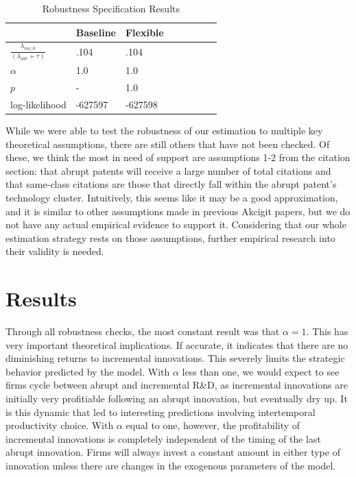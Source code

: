 \documentclass[letterpaper,12pt]{article}
\theoremstyle{definition}
\begin{document}
\begin{table}
	\caption*{Robustness Specification Results}
	\centering\label{tab:Prob}
	\begin{tabular}{l llp{1.5cm} p{0.5cm} llp{1.5cm}}
		\toprule
		    & \multicolumn{1}{c}{Baseline} & \multicolumn{1}{c}{Flexible}\\ 
		\midrule
		$\frac{\lambda_{inc, 0}}{(\lambda_{abr} + \tau)}$ & .104 & .104 \\
		$\alpha$ & 1.0 & 1.0\\
		$p$ & - & 1.0 \\
		log-likelihood & -627597 & -627598 \\
		\bottomrule
	\end{tabular}
\end{table}

While we were able to test the robustness of our estimation to multiple key theoretical assumptions, there are still others that have not been checked. Of these, we think the most in need of support are assumptions 1-2 from the citation section: that abrupt patents will receive a large number of total citations and that same-class citations are those that directly fall within the abrupt patent’s technology cluster. Intuitively, this seems like it may be a good approximation, and it is similar to other assumptions made in previous Akcigit papers, but we do not have any actual empirical evidence to support it. Considering that our whole estimation strategy rests on those assumptions, further empirical research into their validity is needed.

\section{Results}\label{sec:Results}

Through all robustness checks, the most constant result was that $\alpha = 1$. This has very important theoretical implications.  If accurate, it indicates that there are no diminishing returns to incremental innovations. This severely limits the strategic behavior predicted by the model. With $\alpha$ less than one, we would expect to see firms cycle between abrupt and incremental R\&D, as incremental innovations are initially very profitiable following an abrupt innovation, but eventually dry up. It is this dynamic that led to interesting predictions involving intertemporal productivity choice. With $\alpha$ equal to one, however, the profitability of incremental innovations is completely independent of the timing of the last abrupt innovation. Firms will always invest a constant amount in either type of innovation unless there are changes in the exogenous parameters of the model.
\end{document}
